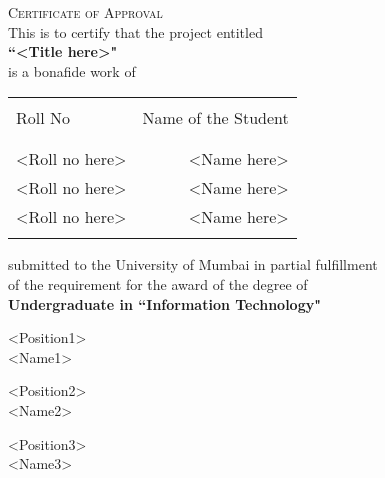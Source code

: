 \newpage

\begin{center}
    \Large \textsc {Certificate of Approval}\\[0.5cm]
    \normalsize This is to certify that the project entitled\\[0.5cm]
    \large \textbf {``<Title here>"}\\[0.5cm]
    \normalsize is a bonafide work of
\end{center}

\begin{table}[h]
    \centering
    \begin{tabular}{lr}\hline                           \\
        Roll No        & Name of the Student \\ \\ \hline
        \\
        <Roll no here> & <Name here>         \\
        <Roll no here> & <Name here>         \\
        <Roll no here> & <Name here>         \\ \\ \hline
    \end{tabular}
\end{table}

\begin{center}
    submitted to the University of Mumbai in partial fulfillment\\
    of the requirement for the award of the degree of\\[0.5cm]
    \large \textbf {Undergraduate in ``Information Technology"}\\[1.5cm]
\end{center}

\begin{center}
    \begin{minipage}[b]{0.33333\textwidth}
        \raggedright
        <Position1>\\
        <Name1>
    \end{minipage}%
    \begin{minipage}[b]{0.33333\textwidth}
        \centering
        <Position2>\\
        <Name2>
    \end{minipage}%
    \begin{minipage}[b]{0.33333\textwidth}
        \raggedleft
        <Position3>\\
        <Name3>
    \end{minipage}
\end{center}